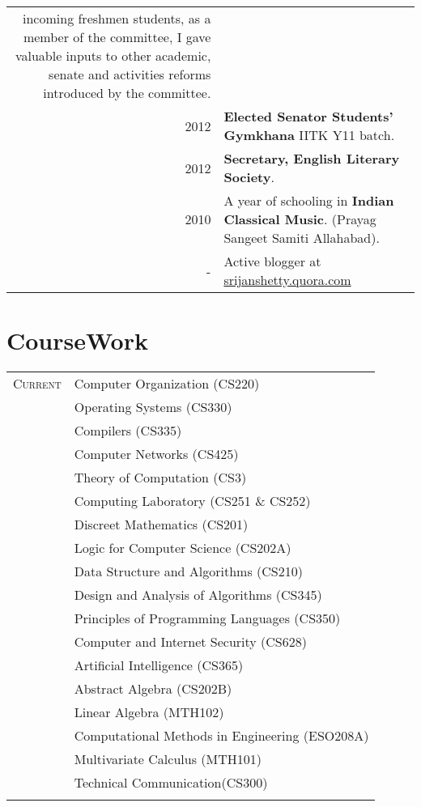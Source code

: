 \documentclass[a4paper,10pt]{article} %
\begin{document}
\begin{tabular}{rp{12cm}}
{{            incoming freshmen students}, as a member of the committee, I gave valuable inputs to other academic,
            senate and activities reforms introduced by the committee.}\\
    2012 & \textbf{Elected Senator Students' Gymkhana} IITK Y11 batch. \\
    2012 & \textbf{Secretary, English Literary Society}. \\
    2010 & A year of schooling in \textbf{Indian Classical Music}. (Prayag Sangeet Samiti Allahabad). \\
    -   & Active blogger at \href{srijanshetty.quora.com} {srijanshetty.quora.com} \\

\end{tabular}

\section{CourseWork}

\begin{tabular}{rl}

    \textsc{Current} & Computer Organization (CS220) \\
                     & Operating Systems (CS330) \\
                     & Compilers (CS335) \\
                     & Computer Networks (CS425) \\
                     & Theory of Computation (CS3) \\
                     & Computing Laboratory (CS251 \& CS252)\\
                     & Discreet Mathematics (CS201)\\
                     & Logic for Computer Science (CS202A)\\
                     & Data Structure and Algorithms (CS210)\\
                     & Design and Analysis of Algorithms (CS345)\\
                     & Principles of Programming Languages (CS350)\\
                     & Computer and Internet Security (CS628)\\
                     & Artificial Intelligence (CS365)\\
                     & Abstract Algebra (CS202B)\\
                     & Linear Algebra (MTH102)\\
                     & Computational Methods in Engineering (ESO208A)\\
                     & Multivariate Calculus (MTH101)\\
                     & Technical Communication(CS300)\\
                     \\
\end{tabular}
\end{document}
